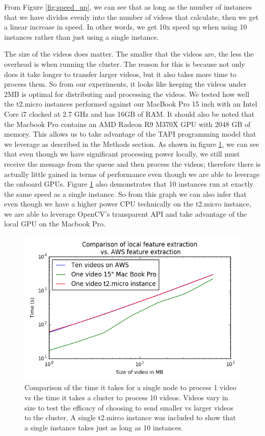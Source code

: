 From Figure \ref{fig:speed_up}, we can see that as long as the number of instances
that we have divides evenly into the number of videos that calculate, then we
get a linear increase in speed. In other words, we get 10x speed up when using
10 instances rather than just using a single instance.

The size of the videos does matter. The smaller that the videos are, the less
the overhead is when running the cluster. The reason for this is because not only
does it take longer to transfer larger videos, but it also takes more time to process
them. So from our experiments, it looks like keeping the videos under 2MB is optimal
for distributing and processing the videos.
We tested how well the t2.micro instances performed against our MacBook Pro 15 inch
with an Intel Core i7 clocked at 2.7 GHz and has 16GB of RAM. It should also be
noted that the Macbook Pro contains an AMD Radeon R9 M370X GPU with 2048 GB of
memory. This allows us to take advantage of the TAPI programming model that
we leverage as described in the Methods section.  As shown in figure \ref{fig:size_matters},
we can see that even though we have significant processing power locally, we still
must receive the message from the queue and then process the videos; therefore
there is actually little gained in terms of performance even though we are able
to leverage the onboard GPUs. Figure \ref{fig:size_matters} also demonstrates
that 10 instances run at exactly the same speed as a single instance. So from this
graph we can also infer that even though we have a higher power CPU technically
on the t2.micro instance, we are able to leverage OpenCV's transparent API and
take advantage of the local GPU on the Macbook Pro.


\begin{figure}[h]
  \centering
  \includegraphics[width=.9\textwidth]{figures/aws_vs_local.png}
  \caption{Comparison of the time it takes for a single node to process 1 video
  vs the time it takes a cluster to process 10 videos. Videos vary in size to
  test the efficacy of choosing to send smaller vs larger videos to the cluster.
  A single t2.mirco instance was included to show that a single instance takes
  just as long as 10 instances.}
  \label{fig:size_matters}
\end{figure}

